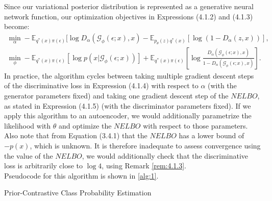 \documentclass[honours,12pt]{unswthesis}
\numberwithin{equation}{section}
\theoremstyle{definition}
\begin{document}
Since our variational posterior distribution is represented as a generative neural network function, our optimization objectives in Expressions (4.1.2) and (4.1.3) become:
\begin{align}
\min_\alpha -\mathbb{E}_{q^*(x)\pi(\epsilon)}[\log D_\alpha(\mathcal{G}_\phi(\epsilon;x),x)-\mathbb{E}_{p_\theta(z)q^*(x)}[\log (1-D_\alpha(z,x))],\\
\min_\phi -\mathbb{E}_{q^*(x)\pi (\epsilon)}[\log p(x|\mathcal{G}_\phi(\epsilon;x))]+\mathbb{E}_{q^*(x)\pi(\epsilon)}\left[\log \frac{D_\alpha(\mathcal{G}_\phi(\epsilon;x),x)}{1-D_\alpha(\mathcal{G}_\phi(\epsilon;x),x)}\right].
\end{align}
In practice, the algorithm cycles between taking multiple gradient descent steps of the discriminative loss in Expression (4.1.4) with respect to $\alpha$ (with the generator parameters fixed) and taking one gradient descent step of the $NELBO$, as stated in Expression (4.1.5) (with the discriminator parameters fixed). If we apply this algorithm to an autoencoder, we would additionally parametrize the likelihood with $\theta$ and optimize the $NELBO$ with respect to those parameters. Also note that from Equation (3.4.1) that the $NELBO$ has a lower bound of $-p(x)$, which is unknown. It is therefore inadequate to assess convergence using the value of the $NELBO$, we would additionally check that the discriminative loss is arbitrarily close to $\log 4$, using Remark \ref{rem:4.1.3}.\\
Pseudocode for this algorithm is shown in \autoref{alg:1}.
\begin{algorithm}
\caption{Prior-Contrastive Class Probability Estimation}
\BlankLine
{}
\label{alg:1}
\end{algorithm}
\newpage
\end{document}
